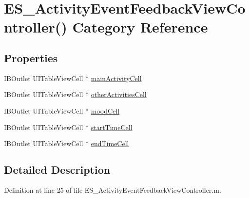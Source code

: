 \hypertarget{category_e_s___activity_event_feedback_view_controller_07_08}{\section{E\+S\+\_\+\+Activity\+Event\+Feedback\+View\+Controller() Category Reference}
\label{category_e_s___activity_event_feedback_view_controller_07_08}
}
\subsection*{Properties}
\begin{DoxyCompactItemize}
\item 
I\+B\+Outlet U\+I\+Table\+View\+Cell $\ast$ \hyperlink{category_e_s___activity_event_feedback_view_controller_07_08_a0990230bcdde5ff9e57b6fdbdc93e1f3}{main\+Activity\+Cell}
\item 
I\+B\+Outlet U\+I\+Table\+View\+Cell $\ast$ \hyperlink{category_e_s___activity_event_feedback_view_controller_07_08_a71c8b25a80320fe363e3496d1221e875}{other\+Activities\+Cell}
\item 
I\+B\+Outlet U\+I\+Table\+View\+Cell $\ast$ \hyperlink{category_e_s___activity_event_feedback_view_controller_07_08_aabd56822ad3153789cf41e6828180c58}{mood\+Cell}
\item 
I\+B\+Outlet U\+I\+Table\+View\+Cell $\ast$ \hyperlink{category_e_s___activity_event_feedback_view_controller_07_08_a6b38a0799c2761108fb0a4d961be00ca}{start\+Time\+Cell}
\item 
I\+B\+Outlet U\+I\+Table\+View\+Cell $\ast$ \hyperlink{category_e_s___activity_event_feedback_view_controller_07_08_a92548b7815868a6d0e658ee93740e12c}{end\+Time\+Cell}
\end{DoxyCompactItemize}


\subsection{Detailed Description}


Definition at line 25 of file E\+S\+\_\+\+Activity\+Event\+Feedback\+View\+Controller.\+m.




